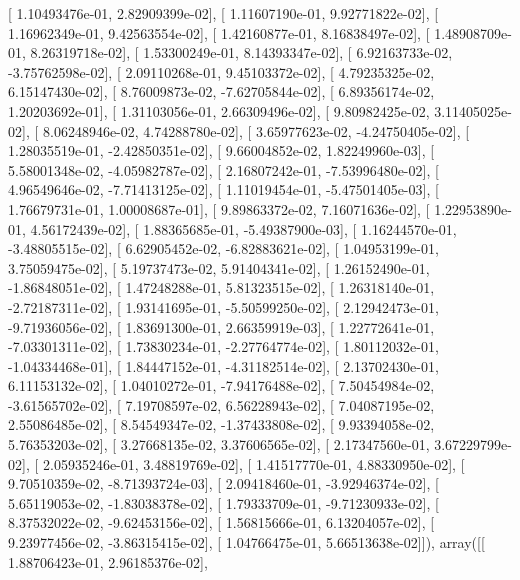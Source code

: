 \documentclass{article}
\begin{document}
       [  1.10493476e-01,   2.82909399e-02],
       [  1.11607190e-01,   9.92771822e-02],
       [  1.16962349e-01,   9.42563554e-02],
       [  1.42160877e-01,   8.16838497e-02],
       [  1.48908709e-01,   8.26319718e-02],
       [  1.53300249e-01,   8.14393347e-02],
       [  6.92163733e-02,  -3.75762598e-02],
       [  2.09110268e-01,   9.45103372e-02],
       [  4.79235325e-02,   6.15147430e-02],
       [  8.76009873e-02,  -7.62705844e-02],
       [  6.89356174e-02,   1.20203692e-01],
       [  1.31103056e-01,   2.66309496e-02],
       [  9.80982425e-02,   3.11405025e-02],
       [  8.06248946e-02,   4.74288780e-02],
       [  3.65977623e-02,  -4.24750405e-02],
       [  1.28035519e-01,  -2.42850351e-02],
       [  9.66004852e-02,   1.82249960e-03],
       [  5.58001348e-02,  -4.05982787e-02],
       [  2.16807242e-01,  -7.53996480e-02],
       [  4.96549646e-02,  -7.71413125e-02],
       [  1.11019454e-01,  -5.47501405e-03],
       [  1.76679731e-01,   1.00008687e-01],
       [  9.89863372e-02,   7.16071636e-02],
       [  1.22953890e-01,   4.56172439e-02],
       [  1.88365685e-01,  -5.49387900e-03],
       [  1.16244570e-01,  -3.48805515e-02],
       [  6.62905452e-02,  -6.82883621e-02],
       [  1.04953199e-01,   3.75059475e-02],
       [  5.19737473e-02,   5.91404341e-02],
       [  1.26152490e-01,  -1.86848051e-02],
       [  1.47248288e-01,   5.81323515e-02],
       [  1.26318140e-01,  -2.72187311e-02],
       [  1.93141695e-01,  -5.50599250e-02],
       [  2.12942473e-01,  -9.71936056e-02],
       [  1.83691300e-01,   2.66359919e-03],
       [  1.22772641e-01,  -7.03301311e-02],
       [  1.73830234e-01,  -2.27764774e-02],
       [  1.80112032e-01,  -1.04334468e-01],
       [  1.84447152e-01,  -4.31182514e-02],
       [  2.13702430e-01,   6.11153132e-02],
       [  1.04010272e-01,  -7.94176488e-02],
       [  7.50454984e-02,  -3.61565702e-02],
       [  7.19708597e-02,   6.56228943e-02],
       [  7.04087195e-02,   2.55086485e-02],
       [  8.54549347e-02,  -1.37433808e-02],
       [  9.93394058e-02,   5.76353203e-02],
       [  3.27668135e-02,   3.37606565e-02],
       [  2.17347560e-01,   3.67229799e-02],
       [  2.05935246e-01,   3.48819769e-02],
       [  1.41517770e-01,   4.88330950e-02],
       [  9.70510359e-02,  -8.71393724e-03],
       [  2.09418460e-01,  -3.92946374e-02],
       [  5.65119053e-02,  -1.83038378e-02],
       [  1.79333709e-01,  -9.71230933e-02],
       [  8.37532022e-02,  -9.62453156e-02],
       [  1.56815666e-01,   6.13204057e-02],
       [  9.23977456e-02,  -3.86315415e-02],
       [  1.04766475e-01,   5.66513638e-02]]), array([[  1.88706423e-01,   2.96185376e-02],
\end{document}
